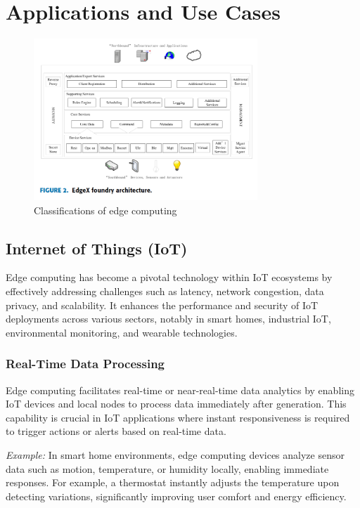 \documentclass[runningheads]{llncs}
\begin{document}
\section{Applications and Use Cases}

\begin{figure}[ht]
    \centering
    \includegraphics[width=0.75\textwidth]{IMG/7.png}
    \caption{Classifications of edge computing}
    \label{fig:edge_classifications}
    \end{figure}

\subsection{Internet of Things (IoT)}

Edge computing has become a pivotal technology within IoT ecosystems by effectively addressing challenges such as latency, network congestion, data privacy, and scalability. It enhances the performance and security of IoT deployments across various sectors, notably in smart homes, industrial IoT, environmental monitoring, and wearable technologies.

\subsubsection{Real-Time Data Processing}
Edge computing facilitates real-time or near-real-time data analytics by enabling IoT devices and local nodes to process data immediately after generation. This capability is crucial in IoT applications where instant responsiveness is required to trigger actions or alerts based on real-time data.

\textit{Example:} In smart home environments, edge computing devices analyze sensor data such as motion, temperature, or humidity locally, enabling immediate responses. For example, a thermostat instantly adjusts the temperature upon detecting variations, significantly improving user comfort and energy efficiency.
\end{document}
